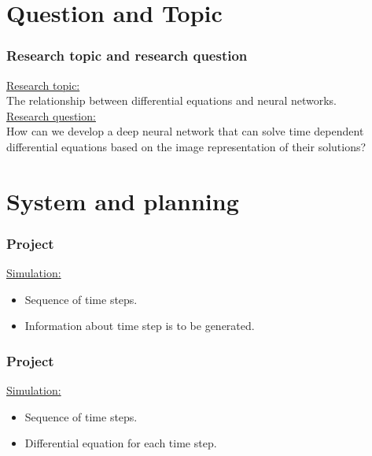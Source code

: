 \documentclass[18pt]{beamer}
\begin{document}
\section{Question and Topic}
\begin{frame}
  \frametitle{Research topic and research question}
  \large{\underline{Research topic:}}\\
  \vspace*{0.2cm}
  The relationship between differential equations and neural networks.
  \vspace*{2cm}
  \\
  \large{\underline{Research question:}}
  \vspace*{0.2cm}
  \\
  How can we develop a deep neural network that can solve time dependent differential equations based on the image representation of their solutions?
\end{frame}

\section{System and planning}
\begin{frame}[t]
  \frametitle{Project}
  \begin{center}
    \large{\underline{Simulation:}}
  \end{center}
  \begin{figure}[htb]
    
  \end{figure}
  \vspace{2cm}  
  \begin{itemize}
  \item Sequence of time steps.
  \item Information about time step is to be generated.
  \end{itemize}  
\end{frame}

\begin{frame}[t]
  \frametitle{Project}
  \begin{center}
    \large{\underline{Simulation:}}
  \end{center}
  \begin{figure}[htb]
    
  \end{figure}
  \vspace{2cm}  
  \begin{itemize}
  \item Sequence of time steps.
  \item Differential equation for each time step.
  \end{itemize}  
\end{frame}
\end{document}
